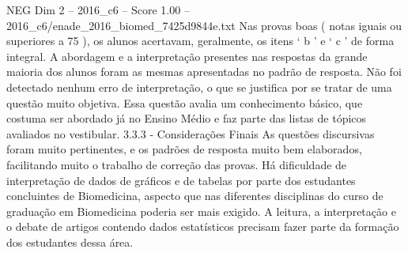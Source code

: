 \begin{textsample}{NEG Dim 2 – 2016\_c6 – Score 1.00 – 2016\_c6/enade\_2016\_biomed\_7425d9844e.txt}
Nas provas boas ( notas iguais ou superiores a 75 ), os alunos acertavam, geralmente, os itens ‘ b ’ e ‘ c ’ de forma integral.
A abordagem e a interpretação presentes nas respostas da grande maioria dos alunos foram as mesmas apresentadas no padrão de resposta.
Não foi detectado nenhum erro de interpretação, o que se justifica por se tratar de uma questão muito objetiva.
Essa questão avalia um conhecimento básico, que costuma ser abordado já no Ensino Médio e faz parte das listas de tópicos avaliados no vestibular. 3.3.3 - Considerações Finais As questões discursivas foram muito pertinentes, e os padrões de resposta muito bem elaborados, facilitando muito o trabalho de correção das provas.
Há dificuldade de interpretação de dados de gráficos e de tabelas por parte dos estudantes concluintes de Biomedicina, aspecto que nas diferentes disciplinas do curso de graduação em Biomedicina poderia ser mais exigido.
A leitura, a interpretação e o debate de artigos contendo dados estatísticos precisam fazer parte da formação dos estudantes dessa área.

\end{textsample}
